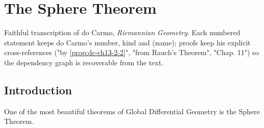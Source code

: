 \chapter{The Sphere Theorem}
\label{chap:dc-sphere-theorem}

Faithful transcription of do Carmo, \emph{Riemannian Geometry}. Each numbered
statement keeps do Carmo's number, kind and (name); proofs keep his explicit
cross-references ("by \cref{prop:dc-ch13-2-2}", "from Rauch's Theorem", "Chap. 11") so
the dependency graph is recoverable from the text.

\section{Introduction}

One of the most beautiful theorems of Global Differential Geometry is the Sphere
Theorem.

